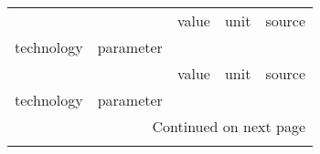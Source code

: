 \begin{longtable}{p{5cm}p{3cm}rp{3cm}p{11cm}}
\toprule
                      &            &          value &                              unit &                                                                                                                                                                                                                                                                                                                               source \\
technology & parameter &                &                                   &                                                                                                                                                                                                                                                                                                                                      \\
\midrule
\endfirsthead

\toprule
                      &            &          value &                              unit &                                                                                                                                                                                                                                                                                                                               source \\
technology & parameter &                &                                   &                                                                                                                                                                                                                                                                                                                                      \\
\midrule
\endhead
\midrule
\multicolumn{5}{r}{{Continued on next page}} \\
\midrule
\endfoot


\end{longtable}
